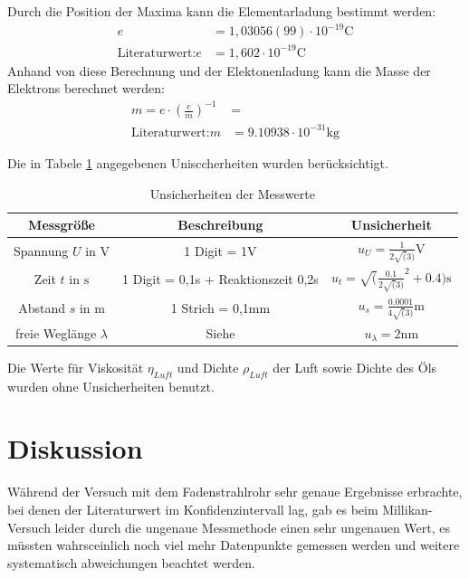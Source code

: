 \documentclass[11pt, a4paper]{article}
\begin{document}
    Durch die Position der Maxima kann die Elementarladung bestimmt werden:
    \begin{align}
        e &= 1,03056(99) \cdot 10^{-19} \si{\coulomb} \\
        \text{Literaturwert:} e &= 1,602 \cdot 10^{-19} \si{\coulomb}
    \end{align}
    Anhand von diese Berechnung und der Elektonenladung kann die Masse der Elektrons berechnet werden:
    \begin{align}
        m = e \cdot \left(\frac{e}{m}\right)^{-1} &= \\
        \text{Literaturwert:} m &= 9.10938 \cdot 10^{-31} \si{\kilogram}
    \end{align}

    Die in Tabele \ref{unsichmili} angegebenen Unisccherheiten wurden berücksichtigt.
    \begin{table}
        \begin{tabular}{c | c | c}
            Messgröße & Beschreibung & Unsicherheit \\ \hline
            Spannung $U$ in $\si{\volt}$ & 1 Digit = 1V & $u_U = \frac{1}{2\sqrt(3)} \si{\volt}$ \\
            Zeit $t$ in $\si{\second}$ & 1 Digit = 0,1s + Reaktionszeit 0,2s & $u_t = \sqrt(\frac{0.1}{2\sqrt(3)}^2 + 0.4) \si{\second}$ \\
            Abstand $s$ in $\si{\metre}$ & 1 Strich = 0,1mm & $u_s = \frac{0.0001}{4\sqrt(3)} \si{\metre}$ \\
            freie Weglänge $\lambda$ & Siehe \cite{ELE} & $u_\lambda = 2 \si{\nano\metre}$ \\
        \end{tabular}
        \caption{Unsicherheiten der Messwerte}
        \label{unsichmili}
    \end{table}
    Die Werte für Viskosität $\eta_{Luft}$ und Dichte $\rho_{Luft}$ der Luft \cite[]{Luft} sowie Dichte des Öls \cite{ELE} wurden ohne Unsicherheiten benutzt.




    \section{Diskussion}
    Während der Versuch mit dem Fadenstrahlrohr sehr genaue Ergebnisse erbrachte, bei denen der Literaturwert im Konfidenzintervall lag, gab es beim Millikan-Versuch leider durch die ungenaue Messmethode einen sehr ungenauen Wert, es müssten wahrsceinlich noch viel mehr Datenpunkte gemessen werden und weitere systematisch abweichungen beachtet werden.
\end{document}
